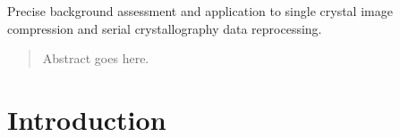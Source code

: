\documentclass[preprint]{iucr}              %
\begin{document}

\maketitle                        %

\begin{synopsis}
Precise background assessment and application to single crystal image compression and serial crystallography data reprocessing. 
\end{synopsis}

\begin{abstract}
Abstract goes here.
\end{abstract}



\section{Introduction}
\end{document}
